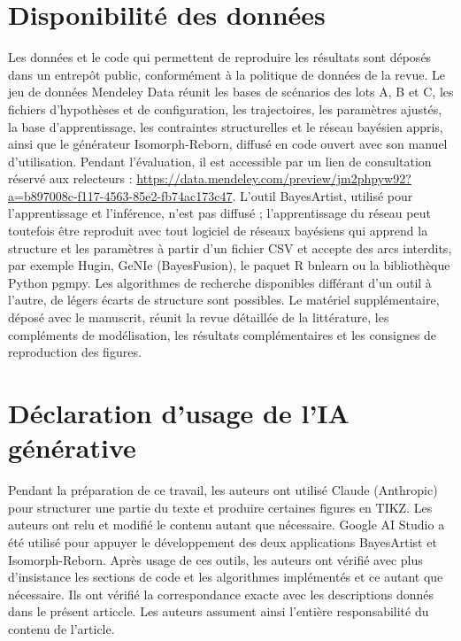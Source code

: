 
\section*{Disponibilité des données}

Les données et le code qui permettent de reproduire les résultats sont déposés dans un entrepôt public, conformément à la politique de données de la revue. Le jeu de données Mendeley Data \citep{screborn2026data} réunit les bases de scénarios des lots A, B et C, les fichiers d'hypothèses et de configuration, les trajectoires, les paramètres ajustés, la base d'apprentissage, les contraintes structurelles et le réseau bayésien appris, ainsi que le générateur Isomorph-Reborn, diffusé en code ouvert avec son manuel d'utilisation. Pendant l'évaluation, il est accessible par un lien de consultation réservé aux relecteurs : \url{https://data.mendeley.com/preview/jm2phpyw92?a=b897008c-f117-4563-85e2-fb74ac173c47}. L'outil BayesArtist, utilisé pour l'apprentissage et l'inférence, n'est pas diffusé ; l'apprentissage du réseau peut toutefois être reproduit avec tout logiciel de réseaux bayésiens qui apprend la structure et les paramètres à partir d'un fichier CSV et accepte des arcs interdits, par exemple Hugin, GeNIe (BayesFusion), le paquet R bnlearn ou la bibliothèque Python pgmpy. Les algorithmes de recherche disponibles différant d'un outil à l'autre, de légers écarts de structure sont possibles. Le matériel supplémentaire, déposé avec le manuscrit, réunit la revue détaillée de la littérature, les compléments de modélisation, les résultats complémentaires et les consignes de reproduction des figures.

\section*{Déclaration d'usage de l'IA générative}

Pendant la préparation de ce travail, les auteurs ont utilisé Claude (Anthropic) pour structurer une partie du texte et produire certaines figures en TIKZ. Les auteurs ont relu et modifié le contenu autant que nécessaire. Google AI Studio a été utilisé pour appuyer le développement des deux applications BayesArtist et Isomorph-Reborn. Après usage de ces outils, les auteurs ont vérifié avec plus d'insistance les sections de code et les algorithmes implémentés et ce autant que nécessaire. Ils ont vérifié la correspondance exacte avec les descriptions donnés dans le présent articcle. Les auteurs assument ainsi l'entière responsabilité du contenu de l'article.

